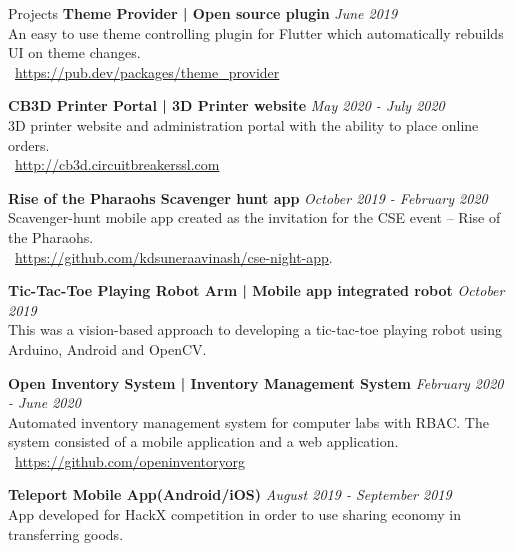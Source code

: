\documentclass{resume}
\begin{document}
\begin{adjustwidth}{55pt}{0pt}
    \begin{rSection}{Projects}
        {\bf Theme Provider | Open source plugin}                               \hfill {\em June 2019}
        \\An easy to use theme controlling plugin for Flutter which automatically rebuilds UI on theme changes.\\
        \faPlug\ \url{https://pub.dev/packages/theme\_provider} \par

        {\bf CB3D Printer Portal | 3D Printer website}                  \hfill {\em May 2020 - July 2020}
        \\3D printer website and administration portal with the ability to place online orders.\\
        \faGlobe\  \url{http://cb3d.circuitbreakerssl.com} \par

        {\bf Rise of the Pharaohs Scavenger hunt app}                           \hfill {\em October 2019 - February 2020}
        \\Scavenger-hunt mobile app created as the invitation for the CSE event – Rise of the Pharaohs.\\
        \faGithub*\ \url{https://github.com/kdsuneraavinash/cse-night-app}. \par

        {\bf Tic-Tac-Toe Playing Robot Arm | Mobile app integrated robot}       \hfill {\em October 2019}
        \\This was a vision-based approach to developing a tic-tac-toe playing robot using Arduino, Android and OpenCV. \par

        {\bf Open Inventory System | Inventory Management System}               \hfill {\em February 2020 - June 2020}
        \\Automated inventory management system for computer labs with RBAC. The system consisted of a mobile application and a web application.\\
        \faGithub\ \url{https://github.com/openinventoryorg} \par

        {\bf Teleport Mobile App(Android/iOS)}                                  \hfill {\em August 2019 - September 2019}
        \\App developed for HackX competition in order to use sharing economy in transferring goods.
    \end{rSection}

\end{adjustwidth}
\end{document}
